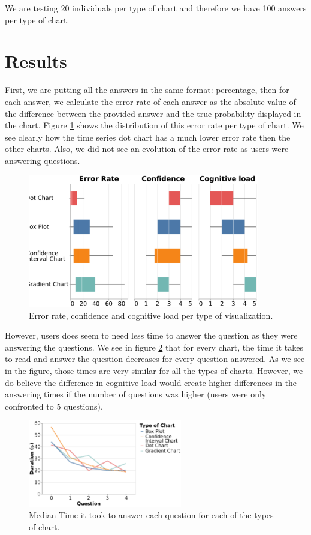 \documentclass[a4paper,3p,sort&compress]{elsarticle}
\begin{document}
We are testing 20 individuals per type of chart and therefore we have 100 answers per 
type of chart.

\section{Results}
\label{sec:results}

First, we are putting all the answers in the same format: percentage, then for each answer, we calculate the 
error rate of each answer as the absolute value of the difference 
between the provided answer and the true probability displayed in the chart. Figure \ref{figure:errors} shows 
the distribution of this error rate per type of chart. We see clearly how the time series dot chart
has a much lower error rate then the other charts. Also, we did not see an evolution of the error rate as 
users were answering questions.

\begin{figure}
  \centering
  \includegraphics[width=0.9\textwidth]{comparison}
  \caption{\label{figure:errors}Error rate, confidence and cognitive load per type of visualization.}
\end{figure}

However, users does seem to need less time to answer the question as they were answering the questions. 
We see in figure \ref{figure:duration} that for every chart, the time it takes 
to read and answer the question decreases for every question answered. As we see in the figure, those times 
are very similar for all the types of charts. However, we do believe the difference in cognitive load would 
create higher differences in the answering times if the number of questions was higher (users were only confronted
to 5 questions).

\begin{figure}
  \centering
   \includegraphics[width=0.6\textwidth]{duration_evo2}
  \caption{\label{figure:duration} Median Time it took to answer each question for each of the types of chart.}
\end{figure}  
\end{document}
